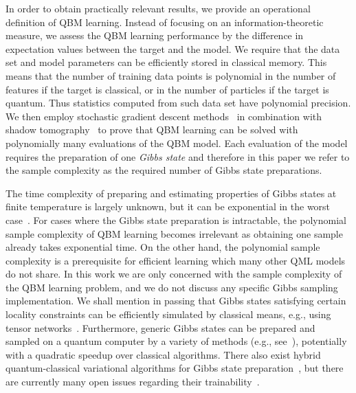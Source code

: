 \documentclass[
    aps,
    prx,
    onecolumn
]{revtex4-2}
\begin{document}
In order to obtain practically relevant results, we provide an operational definition of QBM learning. Instead of focusing on an information-theoretic measure, we assess the QBM learning performance by the difference in expectation values between the target and the model. We require that the data set and model parameters can be efficiently stored in classical memory. This means that the number of training data points is polynomial in the number of features if the target is classical, or in the number of particles if the target is quantum. Thus statistics computed from such data set have polynomial precision. We then employ stochastic gradient descent methods~\cite{Khaled2020, Garrigos2023} in combination with shadow tomography~\cite{Aaronson_2017, Huang_2021, Rouze_2023} to prove that QBM learning can be solved with polynomially many evaluations of the QBM model. Each evaluation of the model requires the preparation of one \emph{Gibbs state} and therefore in this paper we refer to the sample complexity as the required number of Gibbs state preparations.

The time complexity of preparing and estimating properties of Gibbs states at finite temperature is largely unknown, but it can be exponential in the worst case~\cite{Bravyi_2022}. For cases where the Gibbs state preparation is intractable, the polynomial sample complexity of QBM learning becomes irrelevant as obtaining one sample already takes exponential time. On the other hand, the polynomial sample complexity is a prerequisite for efficient learning which many other QML models do not share. In this work we are only concerned with the sample complexity of the QBM learning problem, and we do not discuss any specific Gibbs sampling implementation. We shall mention in passing that Gibbs states satisfying certain locality constraints can be efficiently simulated by classical means, e.g., using tensor networks~\cite{Alhambra_2021,Kuwahara2021}. Furthermore, generic Gibbs states can be prepared and sampled on a quantum computer by a variety of methods (e.g., see~\cite{Poulin_2009, Temme_2011, kastoryano2016quantum, Chowdhury_2016, anschuetz2019realizing, Holmes_2022, chifang2023quantum, zhang2023dissipative, Coopmans_2023}), potentially with a quadratic speedup over classical algorithms. There also exist hybrid quantum-classical variational algorithms for Gibbs state preparation~\cite{Wu_2019, chowdhury2020variational, Liu_2021, zhao2018bias, consiglio2023variational, huijgen2023training}, but there are currently many open issues regarding their trainability~\cite{McClean_2018, Cerezo_2021, Anschuetz_2022, rudolph2023trainability}.
\end{document}
